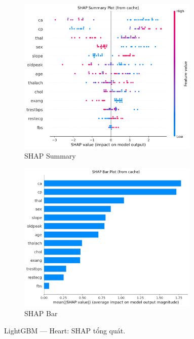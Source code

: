 \begin{figure}[H]
\centering
\begin{subfigure}[b]{0.48\textwidth}\centering
\includegraphics[width=0.95\textwidth]{Result/heart_dataset/LightGBM/SHAP/Summary.png}
\caption{SHAP Summary}\label{fig:lgbm_heart_shap_summary}
\end{subfigure}\hfill
\begin{subfigure}[b]{0.48\textwidth}\centering
\includegraphics[width=0.95\textwidth]{Result/heart_dataset/LightGBM/SHAP/Bar.png}
\caption{SHAP Bar}\label{fig:lgbm_heart_shap_bar}
\end{subfigure}
\caption{LightGBM — Heart: SHAP tổng quát.}
\label{fig:lgbm_heart_shap_overview}
\end{figure}


